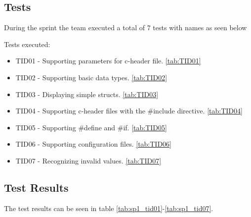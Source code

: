 \subsection{Tests}
During the sprint the team executed a total of 7 tests with names as seen below

\noindent Tests executed:

\begin{itemize}
\item TID01 - Supporting parameters for c-header file. \autoref{tab:TID01}
\item TID02 - Supporting basic data types. \autoref{tab:TID02}
\item TID03 -  Displaying simple structs. \autoref{tab:TID03}
\item TID04 - Supporting c-header files with the \#include directive. \autoref{tab:TID04}
\item TID05 - Supporting \#define and \#if. \autoref{tab:TID05}
\item TID06 - Supporting configuration files. \autoref{tab:TID06}
\item TID07 - Recognizing invalid values. \autoref{tab:TID07}
\end{itemize}

\subsection{Test Results}
The test results can be seen in table \ref{tab:sp1_tid01}-\ref{tab:sp1_tid07}.
\begin{table}[!ht] \footnotesize \center
\caption{Supporting parameters for c-header file \label{tab:sp1_tid01}}
\noindent{}
\end{table}

\begin{table}[!ht] \footnotesize \center
\caption{Supporting basic data types \label{tab:sp1_tid02}}
\noindent{}
\end{table}

